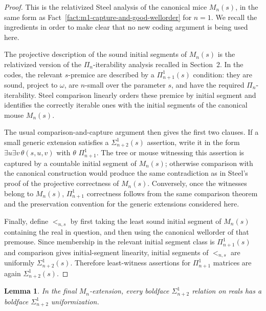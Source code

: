\documentclass[a4paper,11pt]{article}
\newtheorem{lemma}[theorem]{Lemma}
\begin{document}
\begin{proof}
This is the relativized Steel analysis of the canonical mice $M_n(s)$, in the
same form as Fact~\ref{fact:m1-capture-and-good-wellorder} for $n=1$.
We recall the ingredients in order to make clear that no new coding argument
is being used here.

The projective description of the sound initial segments of $M_n(s)$ is the
relativized version of the $\Pi_n$-iterability analysis recalled in
Section~2.  In the codes, the relevant $s$-premice are described by a
$\Pi^1_{n+1}(s)$ condition: they are sound, project to $\omega$, are
$n$-small over the parameter $s$, and have the required $\Pi_n$-iterability.
Steel comparison linearly orders these premice by initial segment and
identifies the correctly iterable ones with the initial segments of the
canonical mouse $M_n(s)$.

The usual comparison-and-capture argument then gives the first two clauses.
If a small generic extension satisfies a $\Sigma^1_{n+2}(s)$ assertion, write
it in the form $\exists u\exists v\,\theta(s,u,v)$ with $\theta$
$\Pi^1_{n+1}$.  The tree or mouse witnessing this assertion is captured by a
countable initial segment of $M_n(s)$; otherwise comparison with the canonical
construction would produce the same contradiction as in Steel's proof of the
projective correctness of $M_n(s)$.  Conversely, once the witnesses belong to
$M_n(s)$, $\Pi^1_{n+1}$ correctness follows from the same comparison theorem
and the preservation convention for the generic extensions considered here.

Finally, define $<_{n,s}$ by first taking the least sound initial segment of
$M_n(s)$ containing the real in question, and then using the canonical
wellorder of that premouse.  Since membership in the relevant initial segment
class is $\Pi^1_{n+1}(s)$ and comparison gives initial-segment linearity,
initial segments of $<_{n,s}$ are uniformly $\Sigma^1_{n+2}(s)$.  Therefore
least-witness assertions for $\Pi^1_{n+1}$ matrices are again
$\Sigma^1_{n+2}(s)$.
\end{proof}

\begin{lemma}\label{Mn-base-uniformization}
In the final $M_n$-extension, every boldface $\Sigma^1_{n+2}$ relation on
reals has a boldface $\Sigma^1_{n+2}$ uniformization.
\end{lemma}
\end{document}
